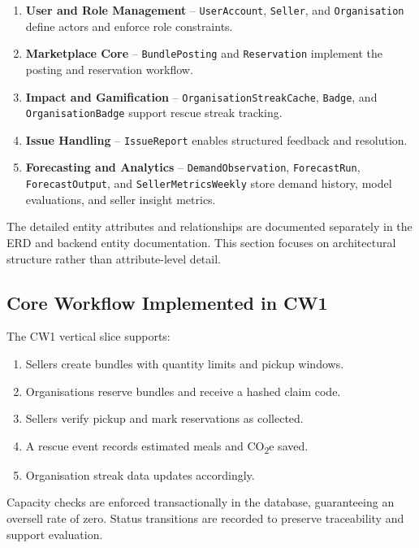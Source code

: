 \documentclass[11pt,a4paper]{article}
\begin{document}
\begin{enumerate}
    \item \textbf{User and Role Management} – \texttt{UserAccount}, \texttt{Seller}, and \texttt{Organisation} define actors and enforce role constraints.
    \item \textbf{Marketplace Core} – \texttt{BundlePosting} and \texttt{Reservation} implement the posting and reservation workflow.
    \item \textbf{Impact and Gamification} – \texttt{OrganisationStreakCache}, \texttt{Badge}, and \texttt{OrganisationBadge} support rescue streak tracking.
    \item \textbf{Issue Handling} – \texttt{IssueReport} enables structured feedback and resolution.
    \item \textbf{Forecasting and Analytics} – \texttt{DemandObservation}, \texttt{ForecastRun}, \texttt{ForecastOutput}, and \texttt{SellerMetricsWeekly} store demand history, model evaluations, and seller insight metrics.
\end{enumerate}

The detailed entity attributes and relationships are documented separately in the ERD and backend entity documentation. This section focuses on architectural structure rather than attribute-level detail.

\subsection{Core Workflow Implemented in CW1}

The CW1 vertical slice supports:

\begin{enumerate}
    \item Sellers create bundles with quantity limits and pickup windows.
    \item Organisations reserve bundles and receive a hashed claim code.
    \item Sellers verify pickup and mark reservations as collected.
    \item A rescue event records estimated meals and CO\textsubscript{2}e saved.
    \item Organisation streak data updates accordingly.
\end{enumerate}

Capacity checks are enforced transactionally in the database, guaranteeing an oversell rate of zero. Status transitions are recorded to preserve traceability and support evaluation.
\end{document}
